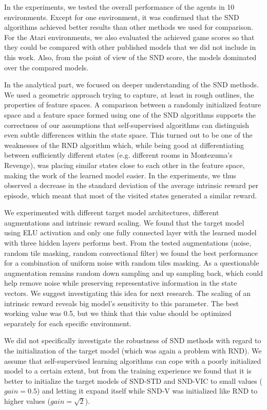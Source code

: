 \documentclass[a4paper,11pt]{elsarticle}
\begin{document}
In the experiments, we tested the overall performance of the agents in 10 environments. Except for one environment, it was confirmed that the SND algorithms achieved better results than other methods we used for comparison. For the Atari environments, we also evaluated the achieved game scores so that they could be compared with other published models that we did not include in this work. Also, from the point of view of the SND score, the models dominated over the compared models.

In the analytical part, we focused on deeper understanding of the SND methods. We used a geometric approach trying to capture, at least in rough outlines, the properties of feature spaces. A comparison between a randomly initialized feature space and a feature space formed using one of the SND algorithms supports the correctness of our assumptions that self-supervised algorithms can distinguish even subtle differences within the state space. This turned out to be one of the weaknesses of the RND algorithm which, while being good at differentiating between sufficiently different states (e.g. different rooms in Montezuma's Revenge), was placing similar states close to each other in the feature space, making the work of the learned model easier. In the experiments, we thus observed a decrease in the standard deviation of the average intrinsic reward per episode, which meant that most of the visited states generated a similar reward.

We experimented with different target model architectures, different augmentations and intrinsic reward scaling. We found that the target model using ELU activation and only one fully connected layer with the learned model with three hidden layers performs best. 
From the tested augmentations (noise, random tile masking, random convectional filter) we found the best performance for a combination of uniform noise with random tiles masking. As a questionable augmentation remains random down sampling and up sampling back, which could help remove noise while preserving representative information in the state vectors. We suggest investigating this idea for next research.
The scaling of an intrinsic reward reveals big model's sensitivity to this parameter. The best working value was 0.5, but we think that this value should be optimized separately for each specific environment.  

We did not specifically investigate the robustness of SND methods with regard to the initialization of the target model (which was again a problem with RND). We assume that self-supervised learning algorithms can cope with a poorly initialized model to a certain extent, but from the training experience we found that it is better to initialize the target models of SND-STD and SND-VIC to small values ($gain = 0.5$) and letting it expand itself while SND-V was initialized like RND to higher values ($gain = \sqrt{2}$).
\end{document}
